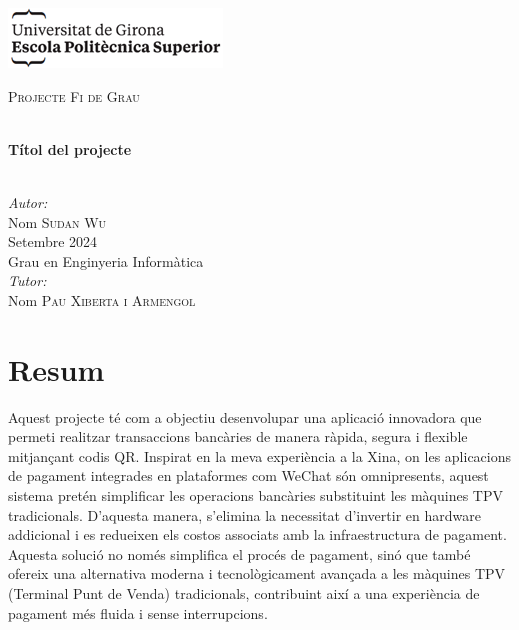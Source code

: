 \documentclass[a4paper,12pt,twoside]{ThesisStyle}
\begin{document}
\begin{titlepage}

\includegraphics[scale=0.9]{imatges/logo_eps.png} \\[1cm]
\begin{center}
\textsc{\Large Projecte Fi de Grau} \\[1cm]

\begin{spacing}{2}
\HRule \\
\textbf{\Huge Títol del projecte} \\
\HRule \\[0.5cm]
\end{spacing}

{
\large
\emph{Autor:} \\
Nom \textsc{Sudan Wu} \\[1cm]
Setembre 2024 \\[1cm]
Grau en Enginyeria Informàtica \\[1cm]
\emph{Tutor:} \\
Nom \textsc{Pau Xiberta i Armengol} \\
}

\end{center}
\end{titlepage}

\titlepage

\dominitoc


\chapter*{Resum}
\label{chp:resum}


Aquest projecte té com a objectiu desenvolupar una aplicació innovadora que permeti realitzar transaccions bancàries de manera ràpida, segura i flexible mitjançant codis QR. Inspirat en la meva experiència a la Xina, on les aplicacions de pagament integrades en plataformes com WeChat són omnipresents, aquest sistema pretén simplificar les operacions bancàries substituint les màquines TPV tradicionals. D'aquesta manera, s'elimina la necessitat d'invertir en hardware addicional i es redueixen els costos associats amb la infraestructura de pagament. Aquesta solució no només simplifica el procés de pagament, sinó que també ofereix una alternativa moderna i tecnològicament avançada a les màquines TPV (Terminal Punt de Venda) tradicionals, contribuint així a una experiència de pagament més fluida i sense interrupcions.\\
\end{document}

